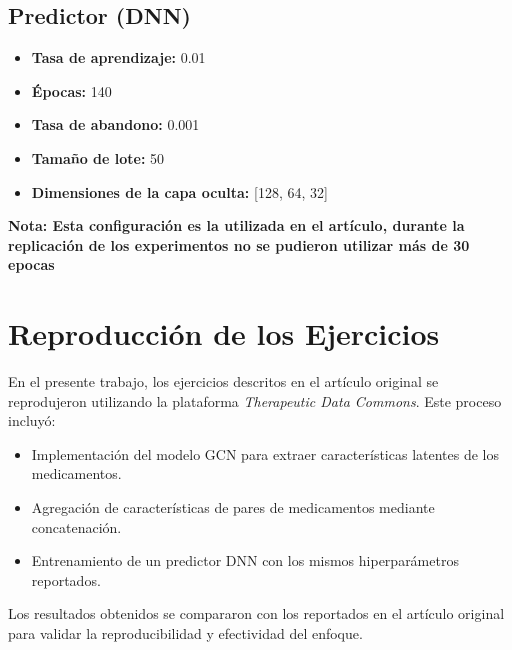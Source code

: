 \subsection{Predictor (DNN)}
\begin{itemize}
    \item \textbf{Tasa de aprendizaje:} 0.01
    \item \textbf{Épocas:} 140
    \item \textbf{Tasa de abandono:} 0.001
    \item \textbf{Tamaño de lote:} 50
    \item \textbf{Dimensiones de la capa oculta:} [128, 64, 32]
\end{itemize}

\textbf{Nota: Esta configuración es la utilizada en el artículo, durante la replicación de los experimentos no se pudieron utilizar más de 30 epocas}


\section{Reproducción de los Ejercicios}

En el presente trabajo, los ejercicios descritos en el artículo original se reprodujeron utilizando la plataforma \textit{Therapeutic Data Commons}. Este proceso incluyó:

\begin{itemize}
    \item Implementación del modelo GCN para extraer características latentes de los medicamentos.
    \item Agregación de características de pares de medicamentos mediante concatenación.
    \item Entrenamiento de un predictor DNN con los mismos hiperparámetros reportados.
\end{itemize}

Los resultados obtenidos se compararon con los reportados en el artículo original para validar la reproducibilidad y efectividad del enfoque.
